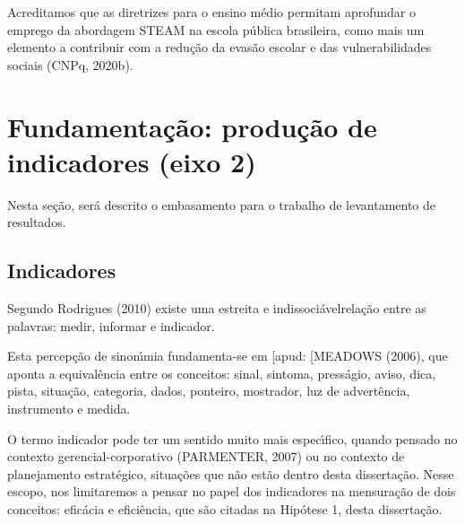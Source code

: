 \documentclass[
12pt,		%
openright,	%
twoside,  %
a4paper,			%
chapter=TITLE,		%
english,			%
french,				%
spanish,			%
brazil				%
]{USPSC-classe/USPSC}
\begin{document}
Acreditamos que as diretrizes para o ensino m\'edio permitam aprofundar o emprego da abordagem STEAM na escola p\'ublica brasileira, como mais um elemento a contribuir com a redu\c{c}\~ao da evas\~ao escolar e das vulnerabilidades sociais  (CNPq, 2020b).








\section[Fundamenta\c{c}\~ao: produ\c{c}\~ao de indicadores (eixo 2)]{Fundamenta\c{c}\~ao: produ\c{c}\~ao de indicadores (eixo 2)}\label{Fundamenta\c{c}\~ao: produ\c{c}\~ao de indicadores (eixo 2)}
Nesta se\c{c}\~ao, ser\'a descrito o embasamento para o trabalho de levantamento de resultados.








\subsection[Indicadores]{Indicadores}\label{Indicadores}
Segundo  Rodrigues (2010)  existe uma \textquotedbl estreita e indissoci\'avel\textquotedbl  rela\c{c}\~ao entre as palavras: medir, informar e \textquotedbl indicador\textquotedbl .








Esta percep\c{c}\~ao de sinon\'{\i}mia fundamenta-se em [apud: [MEADOWS (2006), que aponta a equival\^encia entre os conceitos: sinal, sintoma, press\'agio, aviso, dica, pista, situa\c{c}\~ao, categoria, dados, ponteiro, mostrador, luz de advert\^encia, instrumento e medida.








O termo \textquotedbl  indicador \textquotedbl  pode ter um sentido muito mais espec\'{\i}fico, quando pensado no contexto gerencial-corporativo (PARMENTER, 2007) ou no contexto de planejamento estrat\'egico, situa\c{c}\~oes que n\~ao est\~ao dentro desta disserta\c{c}\~ao. Nesse escopo, nos limitaremos a pensar no papel dos indicadores na mensura\c{c}\~ao de dois conceitos: efic\'acia e efici\^encia, que s\~ao citadas na Hip\'otese 1, desta disserta\c{c}\~ao.
\end{document}

